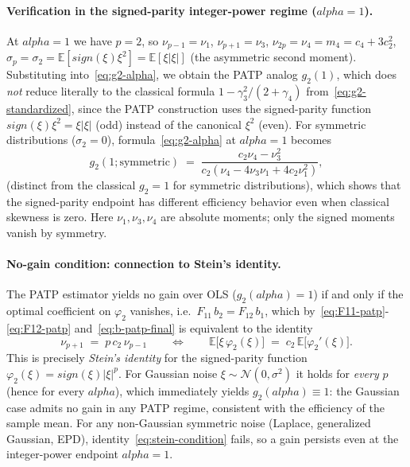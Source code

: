\documentclass[11pt]{article}
\def\alpha{alpha}%
\def\mathrm#1{#1}%
\theoremstyle{definition}
\newcommand{\E}{\mathbb{E}}
\begin{document}
\paragraph{Verification in the signed-parity integer-power regime ($\alpha = 1$).}
At $\alpha = 1$ we have $p = 2$, so
$\nu_{p-1} = \nu_1$, $\nu_{p+1} = \nu_3$, $\nu_{2p} = \nu_4 = m_4 = c_4 + 3c_2^2$,
$\sigma_p = \sigma_2 = \E[\mathrm{sign}(\xi)\xi^2] = \E[\xi|\xi|]$
(the asymmetric second moment). Substituting into~\eqref{eq:g2-alpha},
we obtain the PATP analog $g_2(1)$, which does \emph{not} reduce literally
to the classical formula $1 - \gamma_3^2/(2+\gamma_4)$
from~\eqref{eq:g2-standardized}, since the PATP construction uses the
signed-parity function $\mathrm{sign}(\xi)\xi^2 = \xi|\xi|$ (odd) instead
of the canonical $\xi^2$ (even). For symmetric distributions
($\sigma_2 = 0$), formula~\eqref{eq:g2-alpha} at $\alpha=1$ becomes
\begin{equation}\label{eq:g2-symmetric}
  g_2(1; \text{symmetric})
  \;=\;
  \frac{c_2\nu_4-\nu_3^2}
       {c_2\left(\nu_4-4\nu_3\nu_1+4c_2\nu_1^2\right)} ,
\end{equation}
(distinct from the classical $g_2 = 1$ for symmetric distributions), which
shows that the signed-parity endpoint has different efficiency behavior even
when classical skewness is zero. Here $\nu_1,\nu_3,\nu_4$ are absolute
moments; only the signed moments vanish by symmetry.

\paragraph{No-gain condition: connection to Stein's identity.}
The PATP estimator yields no gain over OLS ($g_2(\alpha) = 1$) if and only if
the optimal coefficient on $\varphi_2$ vanishes, i.e.\ $F_{11}\,b_2 = F_{12}\,b_1$,
which by~\eqref{eq:F11-patp}-\eqref{eq:F12-patp} and~\eqref{eq:b-patp-final} is
equivalent to the identity
\begin{equation}\label{eq:stein-condition}
  \nu_{p+1} \;=\; p\,c_2\,\nu_{p-1}
  \qquad\Longleftrightarrow\qquad
  \E\bigl[\xi\,\varphi_2(\xi)\bigr] \;=\; c_2\,\E\bigl[\varphi_2'(\xi)\bigr].
\end{equation}
This is precisely \emph{Stein's identity} for the signed-parity function
$\varphi_2(\xi) = \mathrm{sign}(\xi)|\xi|^p$. For Gaussian noise
$\xi \sim \mathcal{N}(0, \sigma^2)$ it holds for \emph{every} $p$ (hence for
every $\alpha$), which immediately yields $g_2(\alpha) \equiv 1$: the Gaussian
case admits no gain in any PATP regime, consistent with the efficiency of the
sample mean. For any non-Gaussian symmetric noise (Laplace, generalized
Gaussian, EPD), identity~\eqref{eq:stein-condition} fails, so a gain persists
even at the integer-power endpoint $\alpha = 1$.
\end{document}
